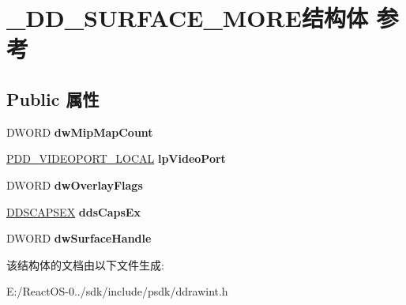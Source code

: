 \hypertarget{struct___d_d___s_u_r_f_a_c_e___m_o_r_e}{}\section{\+\_\+\+D\+D\+\_\+\+S\+U\+R\+F\+A\+C\+E\+\_\+\+M\+O\+R\+E结构体 参考}
\label{struct___d_d___s_u_r_f_a_c_e___m_o_r_e}
\subsection*{Public 属性}
\begin{DoxyCompactItemize}
\item 
\mbox{\label{struct___d_d___s_u_r_f_a_c_e___m_o_r_e_a35b8e5f6f008f76adf9ccef427ce7726}} 
D\+W\+O\+RD {\bfseries dw\+Mip\+Map\+Count}
\item 
\mbox{\label{struct___d_d___s_u_r_f_a_c_e___m_o_r_e_a9879b6d13ea95f4306717a6ec5194a8a}} 
\hyperlink{struct___d_d___v_i_d_e_o_p_o_r_t___l_o_c_a_l}{P\+D\+D\+\_\+\+V\+I\+D\+E\+O\+P\+O\+R\+T\+\_\+\+L\+O\+C\+AL} {\bfseries lp\+Video\+Port}
\item 
\mbox{\label{struct___d_d___s_u_r_f_a_c_e___m_o_r_e_aa8734c31c974c23e731ec1091c302434}} 
D\+W\+O\+RD {\bfseries dw\+Overlay\+Flags}
\item 
\mbox{\label{struct___d_d___s_u_r_f_a_c_e___m_o_r_e_a74cc475e8c041d4550ba9129270bdb61}} 
\hyperlink{struct___d_d_s_c_a_p_s_e_x}{D\+D\+S\+C\+A\+P\+S\+EX} {\bfseries dds\+Caps\+Ex}
\item 
\mbox{\label{struct___d_d___s_u_r_f_a_c_e___m_o_r_e_a85928dd0c025c30e55be6ce2638558ab}} 
D\+W\+O\+RD {\bfseries dw\+Surface\+Handle}
\end{DoxyCompactItemize}


该结构体的文档由以下文件生成\+:\begin{DoxyCompactItemize}
\item 
E\+:/\+React\+O\+S-\/0../sdk/include/psdk/ddrawint.\+h\end{DoxyCompactItemize}
